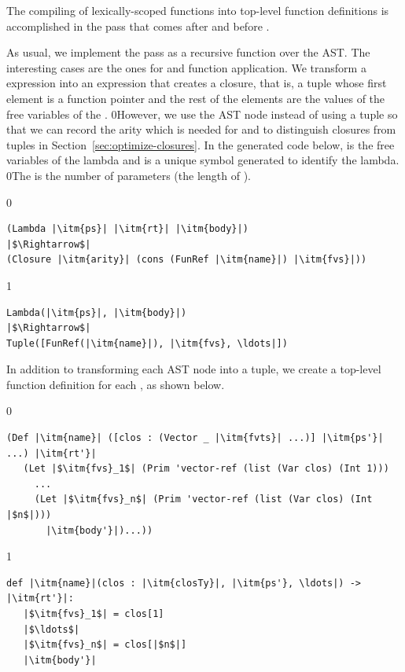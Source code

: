 \documentclass[7x10,nocrop]{TimesAPriori_MIT}%
\def\racketEd{0}
\def\pythonEd{1}
\def\edition{1}
\newcommand{\racket}[1]{{\if\edition\racketEd{#1}\fi}}
\begin{document}
The compiling of lexically-scoped functions into top-level function
definitions is accomplished in the pass 
that comes after  and before
. 

As usual, we implement the pass as a recursive function over the
AST. The interesting cases are the ones for  and function
application. We transform a  expression into an expression
that creates a closure, that is, a tuple whose first element is a
function pointer and the rest of the elements are the values of the
free variables of the .
%
\racket{However, we use the 
  AST node instead of using a tuple so that we can record the arity
  which is needed for \code{procedure-arity} and
to distinguish closures from tuples in
Section~\ref{sec:optimize-closures}.}
%
In the generated code below,  is the free variables of the
lambda and  is a unique symbol generated to identify the lambda.
%
\racket{The  is the number of parameters (the length of
  \itm{ps}).}
%
{\if\edition\racketEd
\begin{lstlisting}
(Lambda |\itm{ps}| |\itm{rt}| |\itm{body}|)
|$\Rightarrow$|
(Closure |\itm{arity}| (cons (FunRef |\itm{name}|) |\itm{fvs}|))
\end{lstlisting}
\fi}
%
{\if\edition\pythonEd
\begin{lstlisting}
Lambda(|\itm{ps}|, |\itm{body}|)
|$\Rightarrow$|
Tuple([FunRef(|\itm{name}|), |\itm{fvs}, \ldots|])
\end{lstlisting}
\fi}
%
In addition to transforming each  AST node into a
tuple, we create a top-level function definition for each
, as shown below.\\
\begin{minipage}{0.8\textwidth}
{\if\edition\racketEd
\begin{lstlisting}
(Def |\itm{name}| ([clos : (Vector _ |\itm{fvts}| ...)] |\itm{ps'}| ...) |\itm{rt'}|
   (Let |$\itm{fvs}_1$| (Prim 'vector-ref (list (Var clos) (Int 1)))
     ...
     (Let |$\itm{fvs}_n$| (Prim 'vector-ref (list (Var clos) (Int |$n$|)))
       |\itm{body'}|)...))
\end{lstlisting}
\fi}
{\if\edition\pythonEd
\begin{lstlisting}
def |\itm{name}|(clos : |\itm{closTy}|, |\itm{ps'}, \ldots|) -> |\itm{rt'}|:
   |$\itm{fvs}_1$| = clos[1]
   |$\ldots$|
   |$\itm{fvs}_n$| = clos[|$n$|]
   |\itm{body'}|
\end{lstlisting}
\fi}
\end{minipage}\\
\end{document}
